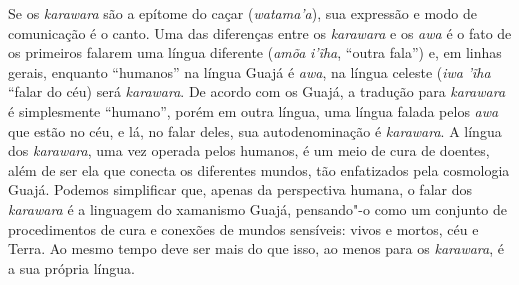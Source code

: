 Se os \emph{karawara} são a epítome do caçar (\emph{watama'a}), sua
expressão e modo de comunicação é o canto. Uma das diferenças entre os
\emph{karawara} e os \emph{awa} é o fato de os primeiros falarem uma
língua diferente (\emph{amõa} \emph{i'ĩha}, ``outra fala'') e, em linhas
gerais, enquanto ``humanos'' na língua Guajá é \emph{awa}, na língua
celeste (\emph{iwa} \emph{'ĩha} ``falar do céu) será \emph{karawara}. De
acordo com os Guajá, a tradução para \emph{karawara} é simplesmente
``humano'', porém em outra língua, uma língua falada pelos \emph{awa}
que estão no céu, e lá, no falar deles, sua autodenominação é
\emph{karawara}. A língua dos \emph{karawara}, uma vez operada pelos
humanos, é um meio de cura de doentes, além de ser ela que conecta os
diferentes mundos, tão enfatizados pela cosmologia Guajá. Podemos
simplificar que, apenas da perspectiva humana, o falar dos
\emph{karawara} é a linguagem do xamanismo Guajá, pensando"-o como um
conjunto de procedimentos de cura e conexões de mundos sensíveis: vivos
e mortos, céu e Terra. Ao mesmo tempo deve ser mais do que isso, ao
menos para os \emph{karawara}, é a sua própria língua.

